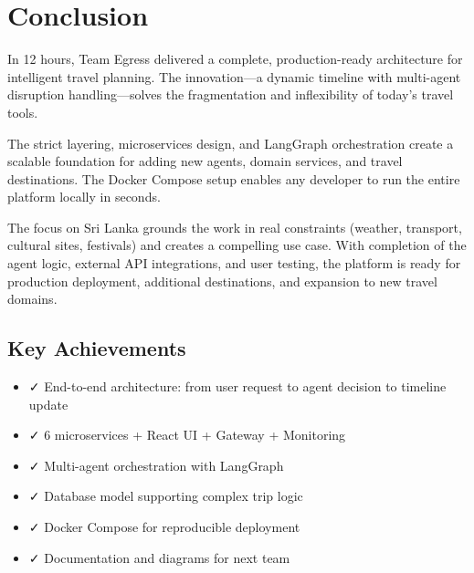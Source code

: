 \documentclass[11pt]{article}
\begin{document}
\section{Conclusion}

In 12 hours, Team Egress delivered a complete, production-ready architecture for intelligent travel planning. The innovation—a dynamic timeline with multi-agent disruption handling—solves the fragmentation and inflexibility of today's travel tools.

The strict layering, microservices design, and LangGraph orchestration create a scalable foundation for adding new agents, domain services, and travel destinations. The Docker Compose setup enables any developer to run the entire platform locally in seconds.

The focus on Sri Lanka grounds the work in real constraints (weather, transport, cultural sites, festivals) and creates a compelling use case. With completion of the agent logic, external API integrations, and user testing, the platform is ready for production deployment, additional destinations, and expansion to new travel domains.

\subsection{Key Achievements}

\begin{itemize}
    \item ✓ End-to-end architecture: from user request to agent decision to timeline update
    \item ✓ 6 microservices + React UI + Gateway + Monitoring
    \item ✓ Multi-agent orchestration with LangGraph
    \item ✓ Database model supporting complex trip logic
    \item ✓ Docker Compose for reproducible deployment
    \item ✓ Documentation and diagrams for next team
\end{itemize}
\end{document}
